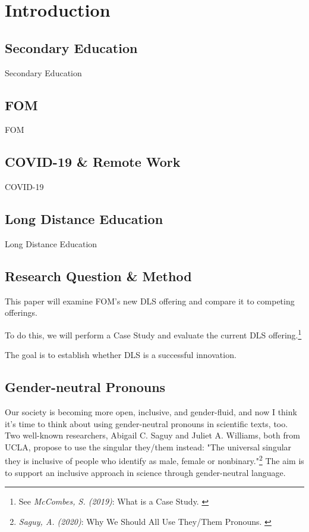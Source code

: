 %
%

\pagebreak
\section{Introduction}

\onehalfspacing

\subsection{Secondary Education}

Secondary Education

\subsection{FOM}

FOM

\subsection{COVID-19 \& Remote Work}

COVID-19

\subsection{Long Distance Education}

Long Distance Education

\subsection{Research Question \& Method}

This paper will examine FOM's new DLS offering and compare it to competing offerings. 

To do this, we will perform a Case Study and evaluate the current DLS offering.\footnote{See \textit{McCombes, S. (2019)}: What is a Case Study. \cite{caseScribbr}}

The goal is to establish whether DLS is a successful innovation.

\subsection{Gender-neutral Pronouns}

Our society is becoming more open, inclusive, and gender-fluid, and now I think it's time to think about using gender-neutral pronouns in scientific texts, too. Two well-known researchers, Abigail C. Saguy and Juliet A. Williams, both from UCLA, propose to use the singular they/them instead: "The universal singular they is inclusive of people who identify as male, female or nonbinary."\footnote{\textit{Saguy, A. (2020)}: Why We Should All Use They/Them Pronouns. \cite{pronouns}} The aim is to support an inclusive approach in science through gender-neutral language. 

